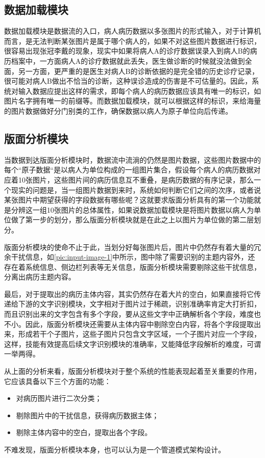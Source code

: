 \subsection{数据加载模块}
数据加载模块是数据流的入口，病人病历数据以多张图片的形式输入，对于计算机而言，是无法判断某张图片是属于哪个病人的，如果不对这些图片数据进行标识，很容易出现张冠李戴的现象，现实中如果将病人A的诊疗数据误录入到病人B的病历档案中，一方面病人A的诊疗数据就此丢失，医生做诊断的时候就没法做到全面，另一方面，更严重的是医生对病人B的诊断依据的是完全错的历史诊疗记录，很可能对病人B做出不恰当的诊断，这种误诊造成的伤害是不可估量的。因此，系统对输入数据应提出这样的需求，即每个病人的病历数据应该具有唯一的标识，如图片名字拥有唯一的前缀等。而数据加载模块，就可以根据这样的标识，来给海量的图片数据做好分门别类的工作，确保数据以病人为原子单位向后传递。

\subsection{版面分析模块}
当数据到达版面分析模块时，数据流中流淌的仍然是图片数据，这些图片数据中的每个“原子数据“是以病人为单位构成的一组图片集合，假设每个病人的病历数据对应着10张图片，这些图片间的病历信息互不重叠，是病历数据的有序记录，那么一个现实的问题是，当一组图片数据到来时，系统如何判断它们之间的次序，或者说某张图片中期望获得的字段数据有哪些呢？这就要求版面分析具有的第一个功能就是分辨这一组10张图片的总体属性，如果说数据加载模块是将图片数据以病人为单位做了第一步的划分，那么版面分析模块就是在此之上以图片为单位做的第二层划分。

版面分析模块的使命不止于此，当划分好每张图片后，图片中仍然存有着大量的冗余干扰信息，如\autoref{pic:input-image-1}中所示，图中除了需要识别的主题内容外，还存在着系统信息、侧边栏列表等无关信息，版面分析模块需要剔除这些干扰信息，分离出病历主题内容。

最后，对于提取出的病历主体内容，其实仍然存在着大片的空白，如果直接将它传递给下游的文字识别模块，文字相对于图片过于稀疏，识别准确率肯定大打折扣，而且识别出来的文字包含有多个字段，要从这些文字中正确解析各个字段，难度也不小。因此，版面分析模块还需要从主体内容中剔除空白内容，将各个字段提取出来，形成若干个子图片，这些子图片只包含文字区域，一个子图片对应一个字段，这样，技能有效提高后续文字识别模块的准确率，又能降低字段解析的难度，可谓一举两得。

从上面的分析来看，版面分析模块对于整个系统的性能表现起着至关重要的作用，它应该具备以下三个方面的功能：
\begin{itemize}
	\item 对病历图片进行二次分类；
	\item 剔除图片中的干扰信息，获得病历数据主体；
	\item 剔除主体内容中的空白，提取出各个字段。
\end{itemize}
不难发现，版面分析模块本身，也可以认为是一个管道模式架构设计。

